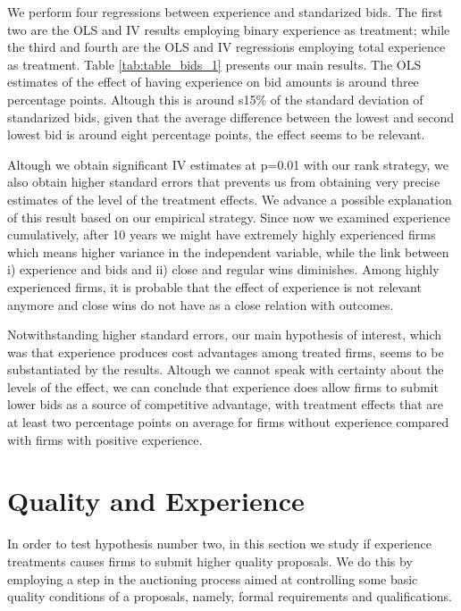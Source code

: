 We perform four regressions between experience and standarized bids. The first two are the OLS and IV results employing binary experience as treatment; while the third and fourth are the OLS and IV regressions employing total experience as treatment. Table \ref{tab:table_bids_1} presents our main results. The OLS estimates of the effect of having experience on bid amounts is around three percentage points. Altough this is around s15\% of the standard deviation of standarized bids, given that the average difference between the lowest and second lowest bid is around eight percentage points, the effect seems to be relevant.

Altough we obtain significant IV estimates at p=0.01 with our rank strategy, we also obtain higher standard errors that prevents us from obtaining very precise estimates of the level of the treatment effects. We advance a possible explanation of this result based on our empirical strategy. Since now we examined experience cumulatively, after 10 years we might have extremely highly experienced firms which means higher variance in the independent variable, while the link between i) experience and bids and ii) close and regular wins diminishes. Among highly experienced firms, it is probable that the effect of experience is not relevant anymore and close wins do not have as a close relation with outcomes.



Notwithstanding higher standard errors, our main hypothesis of interest, which was that experience produces cost advantages among treated firms, seems to be substantiated by the results. Altough we cannot speak with certainty about the levels of the effect, we can conclude that experience does allow firms to submit lower bids as a source of competitive advantage, with treatment effects that are at least two percentage points on average for firms without experience compared with firms with positive experience.


\section{Quality and Experience}
\label{section:qualityexp}
In order to test hypothesis number two, in this section we study if experience treatments causes firms to submit higher quality proposals. We do this by employing a step in the auctioning process aimed at controlling some basic quality conditions of a proposals, namely, formal requirements and qualifications.

